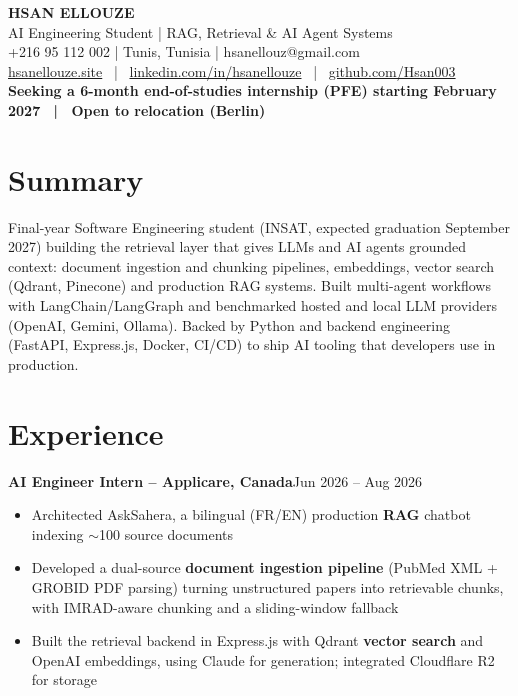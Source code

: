 \documentclass[10pt,a4paper]{article}
\newcommand{\entry}[2]{\vspace{1pt}\noindent\textbf{#1}\hfill{\color{muted}#2}\par}
\begin{document}
\begin{center}
  {\LARGE\bfseries HSAN ELLOUZE}\\[2pt]
  {\color{muted} AI Engineering Student | RAG, Retrieval \& AI Agent Systems}\\[2pt]
  {\footnotesize +216 95 112 002 | Tunis, Tunisia | hsanellouz@gmail.com}\\[1pt]
  {\footnotesize \href{https://hsanellouze.site}{hsanellouze.site} \ | \ \href{https://linkedin.com/in/hsanellouze}{linkedin.com/in/hsanellouze} \ | \ \href{https://github.com/Hsan003}{github.com/Hsan003}}\\[3pt]
  {\footnotesize\bfseries Seeking a 6-month end-of-studies internship (PFE) starting February 2027 \ | \ Open to relocation (Berlin)}
\end{center}

\section{Summary}
Final-year Software Engineering student (INSAT, expected graduation September 2027) building the retrieval layer that gives LLMs and AI agents grounded context: document ingestion and chunking pipelines, embeddings, vector search (Qdrant, Pinecone) and production RAG systems. Built multi-agent workflows with LangChain/LangGraph and benchmarked hosted and local LLM providers (OpenAI, Gemini, Ollama). Backed by Python and backend engineering (FastAPI, Express.js, Docker, CI/CD) to ship AI tooling that developers use in production.

\section{Experience}
\entry{AI Engineer Intern -- Applicare, Canada}{Jun 2026 -- Aug 2026}
\begin{itemize}
  \item Architected AskSahera, a bilingual (FR/EN) production \textbf{RAG} chatbot indexing $\sim$100 source documents
  \item Developed a dual-source \textbf{document ingestion pipeline} (PubMed XML + GROBID PDF parsing) turning unstructured papers into retrievable chunks, with IMRAD-aware chunking and a sliding-window fallback
  \item Built the retrieval backend in Express.js with Qdrant \textbf{vector search} and OpenAI embeddings, using Claude for generation; integrated Cloudflare R2 for storage
\end{itemize}
\end{document}
